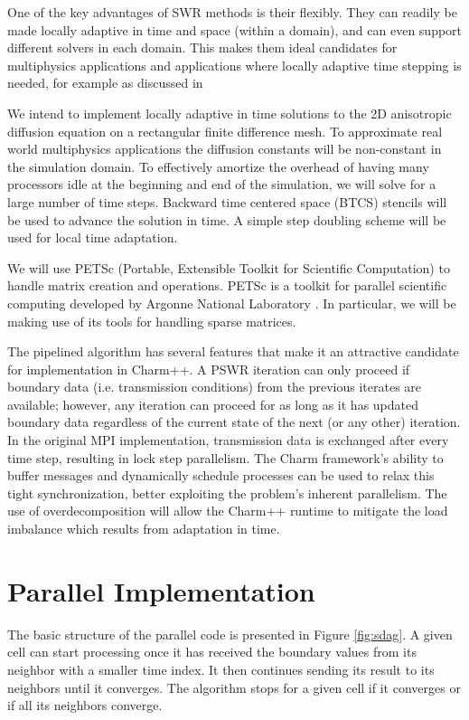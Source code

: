 \documentclass{svmult-ddm}
\begin{document}
One of the key advantages of SWR methods is their flexibly. They can 
readily be made locally adaptive in time and space (within a domain),
and can even support different solvers in each domain. This makes them
ideal candidates for multiphysics applications and applications where
locally adaptive time stepping is needed, for example as discussed in
\cite{lemarie}

We intend to implement locally adaptive in time solutions to the 
2D anisotropic diffusion equation on a rectangular finite difference mesh.
To approximate real world multiphysics applications the diffusion constants
will be non-constant in the simulation domain.
To effectively amortize the overhead of having many processors idle
at the beginning and end of the simulation, we will solve for a
large number of time steps.
Backward time centered space (BTCS) stencils will be used to advance
the solution in time. A simple step doubling scheme will be used for local 
time adaptation.

We will use PETSc (Portable, Extensible Toolkit for Scientific Computation) to handle matrix creation and operations. PETSc is a toolkit for parallel scientific computing developed by Argonne National Laboratory \cite{InsertPETScCitationHere}. In particular, we will be making use of its tools for handling sparse matrices.

The pipelined algorithm has several features that make it an
attractive candidate for implementation in Charm++.  A PSWR iteration
can only proceed if boundary data (i.e. transmission conditions) from
the previous iterates are available; however, any iteration can
proceed for as long as it has updated boundary data regardless of the
current state of the next (or any other) iteration. In the original
MPI implementation, transmission data is exchanged after every time
step, resulting in lock step parallelism. The Charm framework's ability
to buffer messages and dynamically schedule processes can be used to
relax this tight synchronization, better exploiting the problem's
inherent parallelism. The use of overdecomposition will allow the 
Charm++ runtime to mitigate the load imbalance which results from 
adaptation in time.

\section{Parallel Implementation}
The basic structure of the parallel code is presented in Figure \ref{fig:sdag}. 
A given cell can start processing once it has received the boundary values from its neighbor with a smaller time index.
It then continues sending its result to its neighbors until it converges. The algorithm stops for a given cell if it converges or if all its neighbors converge.
 
\end{document}
